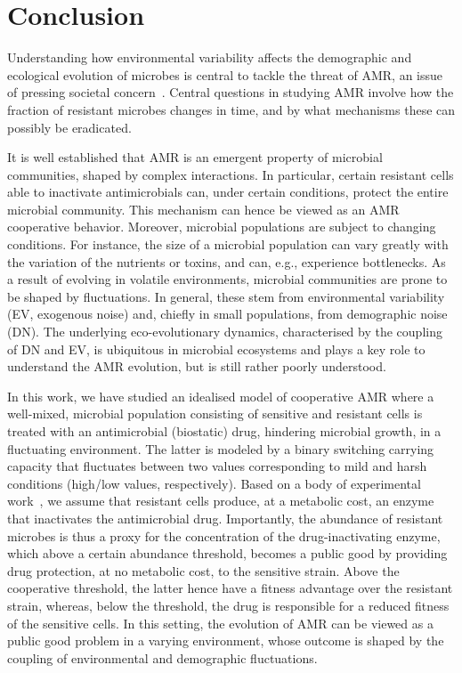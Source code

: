 \documentclass{article}
\begin{document}
\section{Conclusion}\label{Sec:Conclusions}

Understanding how environmental variability affects the demographic and ecological evolution of microbes is central to tackle the threat of AMR, an issue of pressing societal concern~\cite{oneill2016tackling}. Central questions in studying AMR involve how the fraction of resistant microbes changes in time, and by what mechanisms these can possibly be eradicated. 

It is  well established that AMR is an emergent property of microbial communities, shaped by complex interactions. In particular, certain resistant cells able to inactivate antimicrobials can, under certain conditions, protect the entire microbial community. This mechanism can hence be viewed as an AMR cooperative behavior. Moreover, microbial populations are subject to changing conditions. For instance, the size of a microbial population can vary greatly with the variation of the nutrients or toxins, and can, e.g., experience  bottlenecks. As a result of evolving in volatile environments, microbial communities are prone to be shaped by fluctuations. In general, these stem from environmental variability (EV, exogenous noise) and, chiefly in small populations, from demographic noise (DN). The underlying eco-evolutionary dynamics, characterised by the coupling of DN and EV, is ubiquitous in microbial ecosystems and  plays a key role to understand the AMR evolution, but is still rather poorly understood. 

In this work, we have studied an idealised model of cooperative AMR where a well-mixed, microbial population consisting of sensitive and resistant cells is treated with an antimicrobial (biostatic) drug, hindering microbial growth, in a fluctuating environment. The latter is modeled by a binary switching carrying capacity that fluctuates between two values corresponding to mild and harsh  conditions (high/low values, respectively). Based on a body of experimental work~\cite{Yurtsev13, vega2014collective, meredith2015collective, bottery2016selective,davies1994inactivation, Wright05}, we assume that resistant cells produce, at a metabolic cost, an enzyme that inactivates the antimicrobial drug. Importantly, the abundance of resistant microbes is thus a proxy for the concentration of the drug-inactivating enzyme, which above a certain abundance threshold, becomes a public good by providing drug protection, at no metabolic cost, to the sensitive strain. Above the cooperative threshold, the latter hence have a fitness advantage over the resistant strain, whereas, below the threshold, the drug is responsible for a reduced fitness of the sensitive cells. In this setting, the evolution of AMR can be viewed as a public good problem in a varying environment, whose outcome is shaped by the coupling of environmental and demographic fluctuations.
\end{document}
